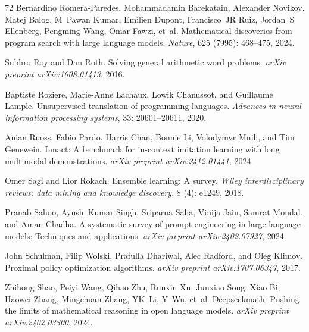 \begin{thebibliography}{72}
Bernardino Romera-Paredes, Mohammadamin Barekatain, Alexander Novikov, Matej Balog, M~Pawan Kumar, Emilien Dupont, Francisco~JR Ruiz, Jordan~S Ellenberg, Pengming Wang, Omar Fawzi, et~al.
\newblock Mathematical discoveries from program search with large language models.
\newblock \emph{Nature}, 625 (7995): 468--475, 2024.

Subhro Roy and Dan Roth.
\newblock Solving general arithmetic word problems.
\newblock \emph{arXiv preprint arXiv:1608.01413}, 2016.

Baptiste Roziere, Marie-Anne Lachaux, Lowik Chanussot, and Guillaume Lample.
\newblock Unsupervised translation of programming languages.
\newblock \emph{Advances in neural information processing systems}, 33: 20601--20611, 2020.

Anian Ruoss, Fabio Pardo, Harris Chan, Bonnie Li, Volodymyr Mnih, and Tim Genewein.
\newblock Lmact: A benchmark for in-context imitation learning with long multimodal demonstrations.
\newblock \emph{arXiv preprint arXiv:2412.01441}, 2024.

Omer Sagi and Lior Rokach.
\newblock Ensemble learning: A survey.
\newblock \emph{Wiley interdisciplinary reviews: data mining and knowledge discovery}, 8 (4): e1249, 2018.

Pranab Sahoo, Ayush~Kumar Singh, Sriparna Saha, Vinija Jain, Samrat Mondal, and Aman Chadha.
\newblock A systematic survey of prompt engineering in large language models: Techniques and applications.
\newblock \emph{arXiv preprint arXiv:2402.07927}, 2024.

John Schulman, Filip Wolski, Prafulla Dhariwal, Alec Radford, and Oleg Klimov.
\newblock Proximal policy optimization algorithms.
\newblock \emph{arXiv preprint arXiv:1707.06347}, 2017.

Zhihong Shao, Peiyi Wang, Qihao Zhu, Runxin Xu, Junxiao Song, Xiao Bi, Haowei Zhang, Mingchuan Zhang, YK~Li, Y~Wu, et~al.
\newblock Deepseekmath: Pushing the limits of mathematical reasoning in open language models.
\newblock \emph{arXiv preprint arXiv:2402.03300}, 2024.


\end{thebibliography}
